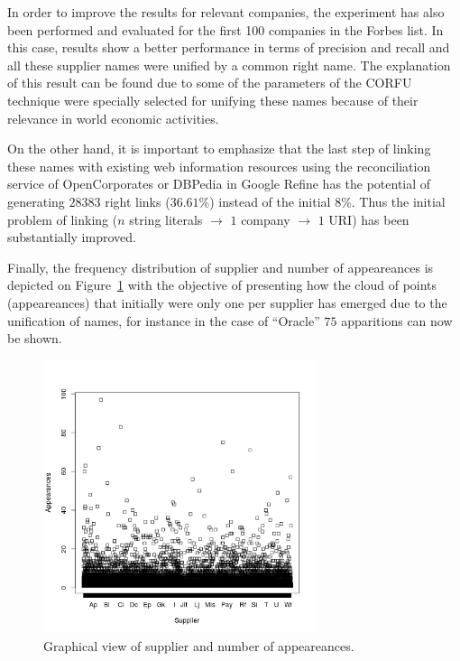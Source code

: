 \documentclass{llncs}
\begin{document}
In order to improve the results for relevant companies, the experiment has also 
been performed and evaluated for the first 100 companies in the Forbes list. In this case, 
results show a better performance in terms of precision and recall and all these supplier names 
were unified by a common right name. The explanation of this result can be found due 
to some of the parameters of the CORFU technique were specially selected for unifying 
these names because of their relevance in world economic activities.

On the other hand, it is important to emphasize that the last step of linking these names 
with existing web information resources using the reconciliation service of 
OpenCorporates or DBPedia in Google Refine has the potential of generating $28383$ right 
links ($36.61$\%) instead of the initial $8$\%. Thus the initial problem of linking ($n$ string literals $\to$ 
$1$ company $\to$ $1$ URI) has been substantially improved. 

Finally, the frequency distribution of supplier and number of appeareances is depicted on Figure~\ref{fig:results-graph-3} with the objective of presenting 
how the cloud of points (appeareances) that initially were only one per supplier has 
emerged due to the unification of names, for instance in the case of ``Oracle'' $75$ apparitions can 
now be shown.

\begin{figure}[!htb]
\centering
	\includegraphics[width=8cm]{./imgs/corfu-stats}
\caption{Graphical view of supplier and number of appeareances.}
\label{fig:results-graph-3}
\end{figure}
\end{document}
